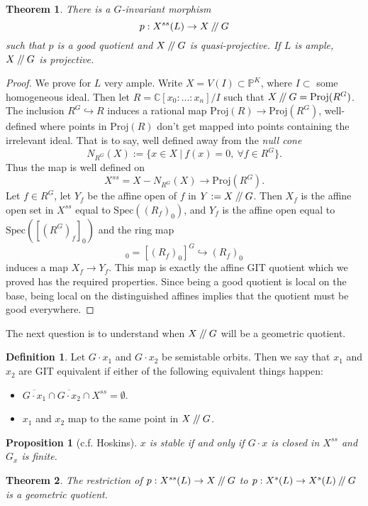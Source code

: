 \documentclass{article}
\newtheorem{thm}{Theorem}
\newtheorem{prop}{Proposition}
\theoremstyle{definition}
\newtheorem{defn}{Definition}
\newcommand{\C}{\mathbb{C}}
\newcommand{\bP}{\mathbb{P}}
\newcommand{\sslash}{\mathbin{/\mkern-4mu/}}
\newcommand{\Spec}{\text{Spec}}
\newcommand{\Proj}{\text{Proj}}
\begin{document}
	\begin{thm}
		There is a $G$-invariant morphism $$p:X^{ss}(L)\to X\sslash G$$ such that $p$ is a good quotient and $X\sslash G$ is quasi-projective. If $L$ is ample, $X\sslash G$ is projective.
	\end{thm}
	\begin{proof}
		We prove for $L$ very ample. Write $X=V(I)\subset\bP^K$, where $I\subset$ some homogeneous ideal. Then let $R=\C[x_0:...:x_n]/I$ such that $X\sslash G = \Proj(R^G)$. The inclusion $R^G\hookrightarrow R$ induces a rational map $\Proj(R)\to \Proj(R^G)$, well-defined where points in $\Proj(R)$ don't get mapped into points containing the irrelevant ideal. That is to say, well defined away from the \emph{null cone}
		\begin{equation}
			N_{R^G}(X):=\{x\in X ~|~ f(x)=0, ~\forall f\in R^G\}.
		\end{equation}
		Thus the map is well defined on
		\begin{equation*}
			X^{ss} = X-N_{R^G}(X)\to \Proj(R^G).
		\end{equation*}
		Let $f\in R^G$, let $Y_f$ be the affine open of $f$ in $Y:=X\sslash G$. Then $X_f$ is the affine open set in $X^{ss}$ equal to $\Spec((R_f)_0)$, and $Y_f$ is the affine open equal to $\Spec([(R^G)_f]_0)$ and the ring map
		\begin{equation*}
			[(R^G)_f]_0 = [(R_f)_0]^G \hookrightarrow (R_f)_0
		\end{equation*}
		induces a map $X_f\to Y_f$. This map is exactly the affine GIT quotient which we proved has the required properties. Since being a good quotient is local on the base, being local on the distinguished affines implies that the quotient must be good everywhere. 
	\end{proof}

	The next question is to understand when $X\sslash G$ will be a geometric quotient.
	\begin{defn}
		Let $G\cdot x_1$ and $G\cdot x_2$ be semistable orbits. Then we say that $x_1$ and $x_2$ are GIT equivalent if either of the following equivalent things happen:
		\begin{itemize}
			\item $\overline{G\cdot x_1}\cap\overline{G\cdot x_2}\cap X^{ss} = \emptyset$.
			\item $x_1$ and $x_2$ map to the same point in $X\sslash G$.
		\end{itemize}
	\end{defn}

	\begin{prop}[c.f. Hoskins]
		$x$ is stable if and only if $G\cdot x$ is closed in $X^{ss}$ and $G_x$ is finite.
	\end{prop}
	
	\begin{thm}
		The restriction of $p:X^{ss}(L)\to X\sslash G$ to $p:X^s(L)\to X^s(L)\sslash G$ is a geometric quotient.
	\end{thm}
\end{document}

